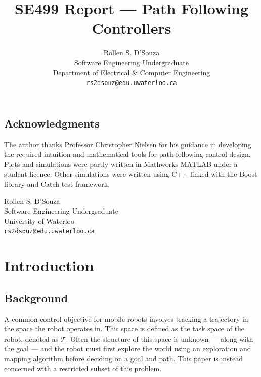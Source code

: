 \documentclass[oneside, 11pt]{book}
\author{{Rollen S. D'Souza}\\
        {Software Engineering Undergraduate}\\
        {Department of Electrical \& Computer Engineering}\\
        {\texttt{rs2dsouz@edu.uwaterloo.ca}}}
\title{\textbf{SE499 Report --- Path Following Controllers}}
\date{}
\begin{document}
\maketitle

\frontmatter
\section*{Acknowledgments}
The author thanks Professor Christopher Nielsen for his guidance in developing the required intuition and mathematical tools for path following control design. Plots and simulations were partly written in Mathworks MATLAB under a student licence. Other simulations were written using C++ linked with the Boost library and Catch test framework.

\begin{flushright}
Rollen S. D'Souza\\
Software Engineering Undergraduate\\
University of Waterloo\\
\texttt{rs2dsouz@edu.uwaterloo.ca}
\end{flushright}

\tableofcontents

\printnomenclature[3cm]
\listoffigures
\listoftables


\mainmatter
\pagestyle{fancy}
\renewcommand{\sectionmark}[1]{\markright{\thesection.\ #1}}

\chapter{Introduction}

\section{Background}
A common control objective for mobile robots involves tracking a trajectory in the space the robot operates in. This space is defined as the task space of the robot, denoted as $\mathcal{T}$. Often the structure of this space is unknown --- along with the goal --- and the robot must first explore the world using an exploration and mapping algorithm before deciding on a goal and path.  This paper is instead concerned with a restricted subset of this problem.
\end{document}
